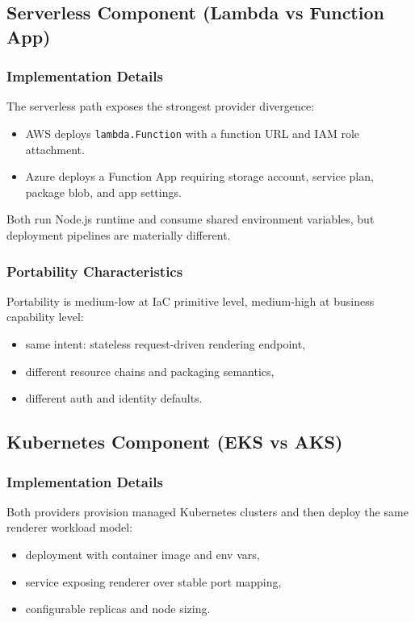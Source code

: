 \documentclass[conference]{IEEEtran}
\begin{document}
\subsection{Serverless Component (Lambda vs Function App)}
\subsubsection{Implementation Details}
The serverless path exposes the strongest provider divergence:
\begin{itemize}
    \item AWS deploys \texttt{lambda.Function} with a function URL and IAM role attachment.
    \item Azure deploys a Function App requiring storage account, service plan, package blob, and app settings.
\end{itemize}

Both run Node.js runtime and consume shared environment variables, but deployment pipelines are materially different.

\subsubsection{Portability Characteristics}
Portability is medium-low at IaC primitive level, medium-high at business capability level:
\begin{itemize}
    \item same intent: stateless request-driven rendering endpoint,
    \item different resource chains and packaging semantics,
    \item different auth and identity defaults.
\end{itemize}

\subsection{Kubernetes Component (EKS vs AKS)}
\subsubsection{Implementation Details}
Both providers provision managed Kubernetes clusters and then deploy the same renderer workload model:
\begin{itemize}
    \item deployment with container image and env vars,
    \item service exposing renderer over stable port mapping,
    \item configurable replicas and node sizing.
\end{itemize}
\end{document}
